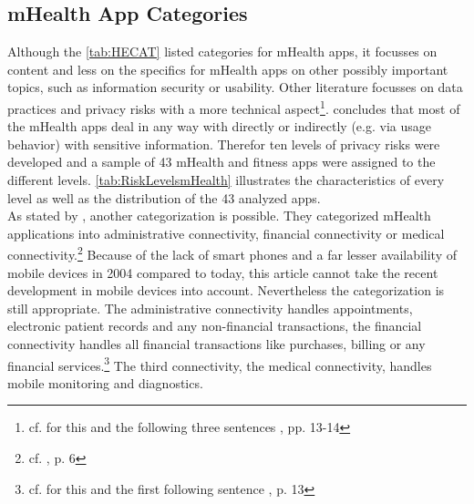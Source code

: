\subsection{mHealth App Categories}
Although the \ref{tab:HECAT} listed categories for mHealth apps, it focusses on content and less on the specifics for mHealth apps on other possibly important topics, such as information security or usability. Other literature focusses on data practices and privacy risks with a more technical aspect\footnote{cf. for this and the following three sentences \cite{Njie.2013}, pp. 13-14}. \cite{Njie.2013} concludes that most of the mHealth apps deal in any way with directly or indirectly (e.g. via usage behavior) with sensitive information. Therefor ten levels of privacy risks were developed and a sample of 43 mHealth and fitness apps were assigned to the different levels. \ref{tab:RiskLevelsmHealth} illustrates the characteristics of every level as well as the distribution of the 43 analyzed apps.
\\
As stated by \cite{Istepanian.2004}, another categorization is possible. They categorized mHealth applications into administrative connectivity, financial connectivity or medical connectivity.\footnote{cf. \cite{Istepanian.2004}, p. 6} Because of the lack of smart phones and a far lesser availability of mobile devices in 2004 compared to today, this article cannot take the recent development in mobile devices into account. Nevertheless the categorization is still appropriate. The administrative connectivity handles appointments, electronic patient records and any non-financial transactions, the financial connectivity handles all financial transactions like purchases, billing or any financial services.\footnote{cf. for this and the first following sentence \cite{Istepanian.2004}, p. 13} The third connectivity, the medical connectivity, handles mobile monitoring and diagnostics.
\\
